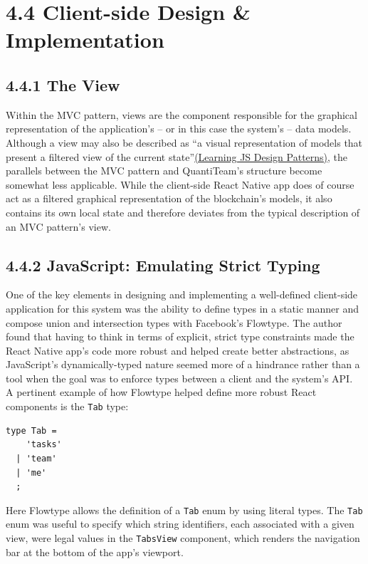 \section{4.4 Client-side Design \&
Implementation}\label{client-side-design-implementation}

\subsection{4.4.1 The View}\label{the-view}

Within the MVC pattern, views are the component responsible for the
graphical representation of the application's -- or in this case the
system's -- data
models\cite{krasner1988description}.
Although a view may also be described as ``a visual representation of
models that present a filtered view of the current
state''\href{https://addyosmani.com/resources/essentialjsdesignpatterns/book/\#detailmvc}{(Learning
JS Design Patterns)}, the parallels between the MVC pattern and
QuantiTeam's structure become somewhat less applicable. While the
client-side React Native app does of course act as a filtered graphical
representation of the blockchain's models, it also contains its own
local state and therefore deviates from the typical description of an
MVC pattern's view.

\subsection{4.4.2 JavaScript: Emulating Strict
Typing}\label{javascript-emulating-strict-typing}

One of the key elements in designing and implementing a well-defined
client-side application for this system was the ability to define types
in a static manner and compose union and intersection types with
Facebook's Flowtype. The author found that having to think in terms of
explicit, strict type constraints made the React Native app's code more
robust and helped create better abstractions, as JavaScript's
dynamically-typed nature seemed more of a hindrance rather than a tool
when the goal was to enforce types between a client and the system's
API.\\
A pertinent example of how Flowtype helped define more robust React
components is the \texttt{Tab} type:

\begin{verbatim}
type Tab =
    'tasks'
  | 'team'
  | 'me'
  ;
\end{verbatim}

Here Flowtype allows the definition of a \texttt{Tab} enum by using
literal
types\cite{1flowtype}. The \texttt{Tab} enum was useful to specify which string
identifiers, each associated with a given view, were legal values in the
\texttt{TabsView} component, which renders the navigation bar at the
bottom of the app's viewport.

